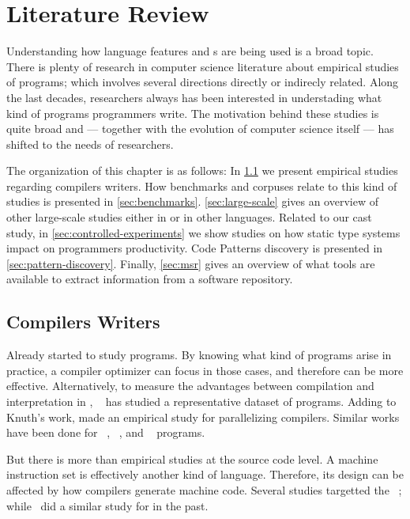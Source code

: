 
\chapter{Literature Review}

\label{cha:literature-review} 

Understanding how language features and \api{}s are being used is a broad topic.
There is plenty of research in computer science literature about empirical studies of programs;
which involves several directions directly or indirecly related.
Along the last decades, researchers always has been interested in understading what kind of programs programmers write.
The motivation behind these studies is quite broad and --- together with the evolution of computer science itself --- has shifted to the needs of researchers.

The organization of this chapter is as follows:
In \cref{sec:compilers-writers} we present empirical studies regarding compilers writers.
How benchmarks and corpuses relate to this kind of studies is presented in \cref{sec:benchmarks}.
\cref{sec:large-scale} gives an overview of other large-scale studies either in \java{} or in other languages.
Related to our cast study, in \cref{sec:controlled-experiments} we show studies on how static type systems impact on programmers productivity.
Code Patterns discovery is presented in \cref{sec:pattern-discovery}.
Finally, \cref{sec:msr} gives an overview of what tools are available to extract information from a software repository.

\section{Compilers Writers} \label{sec:compilers-writers}

Already \cite{knuth_empirical_1971} started to study \fortran{} programs.
By knowing what kind of programs arise in practice, a compiler optimizer can focus in those cases, and therefore can be more effective.
Alternatively, to measure the advantages between compilation and interpretation in \basic{}, ~\cite{hammond_basic_1977} has studied a representative dataset of programs.
Adding to Knuth's work, \cite{shen_empirical_1990} made an empirical study for parallelizing compilers.
Similar works have been done for \cobol{}~\cite{salvadori_static_1975,chevance_static_1978}, \pascal{}~\cite{cook_contextual_1982}, and \apl{}~\cite{saal_properties_1975,saal_empirical_1977} programs.

But there is more than empirical studies at the source code level.
A machine instruction set is effectively another kind of language.
Therefore, its design can be affected by how compilers generate machine code.
Several studies targetted the \jvm{}~\cite{collberg_empirical_2007,odonoghue_bigram_2002,antonioli_analysis_1998}; while~\cite{cook_empirical_1989} did a similar study for \lilith{} in the past.

